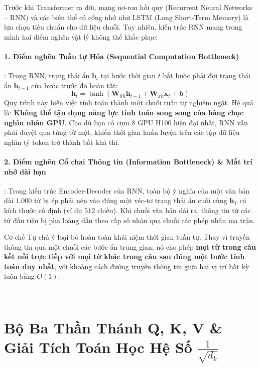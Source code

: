 Trước khi Transformer ra đời, mạng nơ-ron hồi quy (Recurrent Neural Networks -- RNN) và các biến thể có cổng nhớ như LSTM (Long Short-Term Memory) là lựa chọn tiêu chuẩn cho dữ liệu chuỗi. Tuy nhiên, kiến trúc RNN mang trong mình hai điểm nghẽn vật lý không thể khắc phục:

\paragraph{1. Điểm nghẽn Tuần tự Hóa (Sequential Computation Bottleneck)}:
Trong RNN, trạng thái ẩn $\mathbf{h}_t$ tại bước thời gian $t$ bắt buộc phải đợi trạng thái ẩn $\mathbf{h}_{t-1}$ của bước trước đó hoàn tất:
\begin{equation}
\mathbf{h}_t = \tanh(\mathbf{W}_{hh} \mathbf{h}_{t-1} + \mathbf{W}_{xh} \mathbf{x}_t + \mathbf{b})
\end{equation}
Quy trình này biến việc tính toán thành một chuỗi tuần tự nghiêm ngặt. Hệ quả là: \textbf{Không thể tận dụng năng lực tính toán song song của hàng chục nghìn nhân GPU}. Cho dù bạn có cụm 8 GPU H100 hiện đại nhất, RNN vẫn phải duyệt qua từng từ một, khiến thời gian huấn luyện trên các tập dữ liệu nghìn tỷ token trở thành bất khả thi.

\paragraph{2. Điểm nghẽn Cổ chai Thông tin (Information Bottleneck) \& Mất trí nhớ dài hạn}:
Trong kiến trúc Encoder-Decoder của RNN, toàn bộ ý nghĩa của một văn bản dài $1.000$ từ bị ép phải nén vào đúng một véc-tơ trạng thái ẩn cuối cùng $\mathbf{h}_T$ có kích thước cố định (ví dụ $512$ chiều). Khi chuỗi văn bản dài ra, thông tin từ các từ đầu tiên bị pha loãng dần theo cấp số nhân qua chuỗi các phép nhân ma trận.

\begin{definition}
Cơ chế Tự chú ý loại bỏ hoàn toàn khái niệm thời gian tuần tự. Thay vì truyền thông tin qua một chuỗi các bước ẩn trung gian, nó cho phép \textbf{mọi từ trong câu kết nối trực tiếp với mọi từ khác trong câu sau đúng một bước tính toán duy nhất}, với khoảng cách đường truyền thông tin giữa hai vị trí bất kỳ luôn bằng $O(1)$.
\end{definition}

---

\section{Bộ Ba Thần Thánh Q, K, V \& Giải Tích Toán Học Hệ Số $\frac{1}{\sqrt{d_k}}$}
\label{sec:qkv-and-attention-math}

